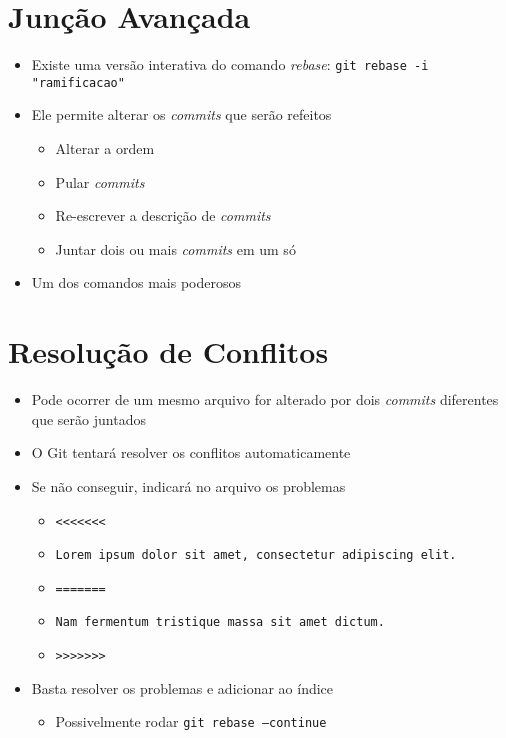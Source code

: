 \documentclass{beamer}
\newenvironment{slide}{\begin{frame}{\insertsection}}{\end{frame}}
\begin{document}
\section{Junção Avançada}
\begin{slide}
    \begin{itemize}
        \item Existe uma versão interativa do comando \emph{rebase}\pause:
            \texttt{git rebase -i "ramificacao"}
        \pause
        \item Ele permite alterar os \emph{commits} que serão refeitos
        \begin{itemize}
            \pause
            \item Alterar a ordem
            \pause
            \item Pular \emph{commits}
            \pause
            \item Re-escrever a descrição de \emph{commits}
            \pause
            \item Juntar dois ou mais \emph{commits} em um só
        \end{itemize}
        \pause
        \item Um dos comandos mais poderosos
    \end{itemize}
\end{slide}

\section{Resolução de Conflitos}
\begin{slide}
    \begin{itemize}
        \item Pode ocorrer de um mesmo arquivo for alterado por dois
            \emph{commits} diferentes que serão juntados
        \pause
        \item O Git tentará resolver os conflitos automaticamente
        \pause
        \item Se não conseguir, indicará no arquivo os problemas
        \begin{itemize}
            \pause
            \item \texttt{<<<<<<<}
            \item \texttt{Lorem ipsum dolor sit amet, consectetur adipiscing
                elit.}
            \item \texttt{=======}
            \item \texttt{Nam fermentum tristique massa sit amet dictum.}
            \item \texttt{>>>>>>>}
        \end{itemize}
        \pause
        \item Basta resolver os problemas e adicionar ao índice
        \begin{itemize}
            \pause
            \item Possivelmente rodar \texttt{git rebase --continue}
        \end{itemize}
    \end{itemize}
\end{slide}
\end{document}
